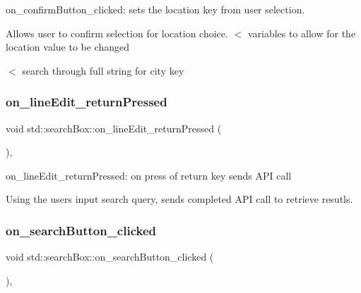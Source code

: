 on\+\_\+confirm\+Button\+\_\+clicked\+: sets the location key from user selection. 

Allows user to confirm selection for location choice. $<$ variables to allow for the location value to be changed

$<$ search through full string for city key \mbox{\label{classstd_1_1searchBox_aa8ed50f177d20e64e215b82839813a6f}} 
\subsubsection{\texorpdfstring{on\+\_\+line\+Edit\+\_\+return\+Pressed}{on\_lineEdit\_returnPressed}}
{\footnotesize\ttfamily void std\+::search\+Box\+::on\+\_\+line\+Edit\+\_\+return\+Pressed (\begin{DoxyParamCaption}{ }\end{DoxyParamCaption})\hspace{0.3cm}{\ttfamily [private]}, {\ttfamily [slot]}}



on\+\_\+line\+Edit\+\_\+return\+Pressed\+: on press of return key sends A\+PI call 

Using the users input search query, sends completed A\+PI call to retrieve resutls. \mbox{\label{classstd_1_1searchBox_ab115b20ee0bfcf98095e3bb6ca9b8dca}} 
\subsubsection{\texorpdfstring{on\+\_\+search\+Button\+\_\+clicked}{on\_searchButton\_clicked}}
{\footnotesize\ttfamily void std\+::search\+Box\+::on\+\_\+search\+Button\+\_\+clicked (\begin{DoxyParamCaption}{ }\end{DoxyParamCaption})\hspace{0.3cm}{\ttfamily [private]}, {\ttfamily [slot]}}



